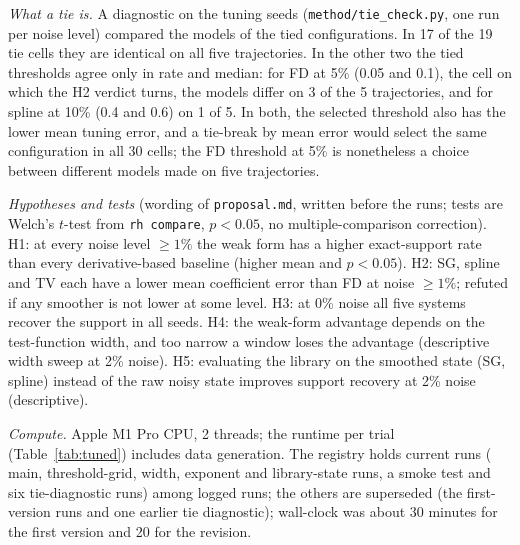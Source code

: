 \textit{What a tie is.} A diagnostic on the tuning seeds (\texttt{method/tie\_check.py}, one run per noise level) compared the models of the tied configurations. In 17 of the 19 tie cells they are identical on all five trajectories. In the other two the tied thresholds agree only in rate and median: for FD at 5\% (0.05 and 0.1), the cell on which the H2 verdict turns, the models differ on 3 of the 5 trajectories, and for spline at 10\% (0.4 and 0.6) on 1 of 5. In both, the selected threshold also has the lower mean tuning error, and a tie-break by mean error would select the same configuration in all 30 cells; the FD threshold at 5\% is nonetheless a choice between different models made on five trajectories.

\begin{table}[t]\centering\caption{Tuned threshold $\lambda$ (in parentheses the value under the first tie rule where it differs); last row: mean seconds per trial over the 120 main runs of the system.}\label{tab:tuned}
\setlength{\tabcolsep}{4pt}\end{table}

\textit{Hypotheses and tests} (wording of \texttt{proposal.md}, written before the runs; tests are Welch's $t$-test from \texttt{rh compare}, $p<0.05$, no multiple-comparison correction). H1: at every noise level $\ge1\%$ the weak form has a higher exact-support rate than every derivative-based baseline (higher mean and $p<0.05$). H2: SG, spline and TV each have a lower mean coefficient error than FD at noise $\ge1\%$; refuted if any smoother is not lower at some level. H3: at 0\% noise all five systems recover the support in all seeds. H4: the weak-form advantage depends on the test-function width, and too narrow a window loses the advantage (descriptive width sweep at 2\% noise). H5: evaluating the library on the smoothed state (SG, spline) instead of the raw noisy state improves support recovery at 2\% noise (descriptive).

\textit{Compute.} Apple M1 Pro CPU, 2 threads; the runtime per trial (Table~\ref{tab:tuned}) includes data generation. The registry holds  current runs ( main,  threshold-grid,  width,  exponent and  library-state runs, a smoke test and six tie-diagnostic runs) among  logged runs; the others are superseded (the first-version runs and one earlier tie diagnostic); wall-clock was about 30 minutes for the first version and 20 for the revision.
